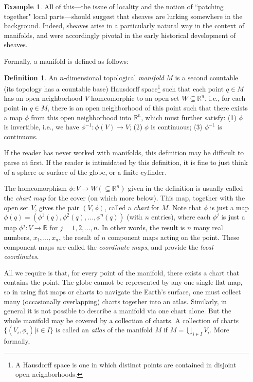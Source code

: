 \documentclass[a4paper]{book}
\theoremstyle{definition}
\newtheorem{example}{Example}[section]
\theoremstyle{definition}
\newtheorem{definition}{Definition}[section]
\theoremstyle{definition}
\theoremstyle{theorem}
\theoremstyle{definition}
\begin{document}
\begin{example}
	All of this---the issue of locality and the notion of ``patching together" local parts---should suggest that sheaves are lurking somewhere in the background. Indeed, sheaves arise in a particularly natural way in the context of manifolds, and were accordingly pivotal in the early historical development of sheaves.\par 
	Formally, a manifold is defined as follows: 
	\begin{definition} An $n$-dimensional topological \textit{manifold} $M$ is a second countable (its topology has a countable base) Hausdorff space\footnote{A Hausdorff space is one in which distinct points are contained in disjoint open neighborhoods.} such that each point $q \in M$ has an open neighborhood $V$ homeomorphic to an open set $W \subseteq \mathbb{R}^{n}$, i.e., for each point in $q \in M$, there is an open neighborhood of this point such that there exists a map $\phi$ from this open neighborhood into $\mathbb{R}^n$, which must further satisfy: (1) $\phi$ is invertible, i.e., we have $\phi^{-1}: \phi(V) \rightarrow V$; (2) $\phi$ is continuous; (3) $\phi^{-1}$ is continuous.
	\end{definition}  \noindent 
If the reader has never worked with manifolds, this definition may be difficult to parse at first. If the reader is intimidated by this definition, it is fine to just think of a sphere or surface of the globe, or a finite cylinder. \par 
The homeomorphism $\phi: V \rightarrow W (\subseteq \mathbb{R}^{n})$ given in the definition is usually called the \textit{chart map} for the cover (on which more below). This map, together with the open set $V$, gives the pair $(V, \phi)$, called a \textit{chart} for $M$. Note that $\phi$ is just a map $\phi(q) = (\phi^1 (q), \phi^2 (q),\dots, \phi^n (q))$ (with $n$ entries), where each $\phi^j$ is just a map $\phi^j : V \rightarrow \mathbb{R}$ for $j = 1, 2,..., n$. In other words, the result is $n$ many real numbers, $x_1, \dots,x_n$, the result of $n$ component maps acting on the point. These component maps are called the \textit{coordinate maps}, and provide the \textit{local coordinates}.
	\par  
	All we require is that, for every point of the manifold, there exists a chart that contains the point. The globe cannot be represented by any one single flat map, so in using flat maps or charts to navigate the Earth's surface, one must collect many (occasionally overlapping) charts together into an atlas. Similarly, in general it is not possible to describe a manifold via one chart alone. But the whole manifold may be covered by a collection of charts. A collection of charts $\{(V_i, \phi_i) | i \in I\}$ is called an \textit{atlas} of the manifold $M$ if $M = \bigcup_{i \in I} V_i$. More formally, 

\end{example}
\end{document}
